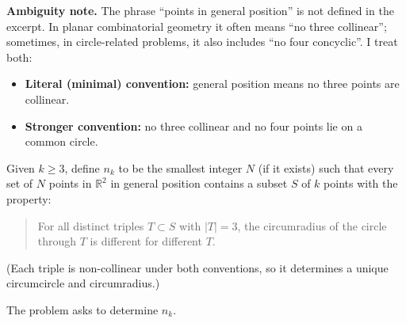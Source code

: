 \textbf{Ambiguity note.} The phrase ``points in general position'' is not defined in the excerpt. In planar combinatorial geometry it often means ``no three collinear''; sometimes, in circle-related problems, it also includes ``no four concyclic''. I treat both:
\begin{itemize}
\item \textbf{Literal (minimal) convention:} general position means no three points are collinear.
\item \textbf{Stronger convention:} no three collinear and no four points lie on a common circle.
\end{itemize}

Given $k\ge 3$, define $n_k$ to be the smallest integer $N$ (if it exists) such that every set of $N$ points in $\mathbb{R}^2$ in general position contains a subset $S$ of $k$ points with the property:
\begin{quote}
For all distinct triples $T\subset S$ with $|T|=3$, the circumradius of the circle through $T$ is different for different $T$.
\end{quote}
(Each triple is non-collinear under both conventions, so it determines a unique circumcircle and circumradius.)

The problem asks to determine $n_k$.
